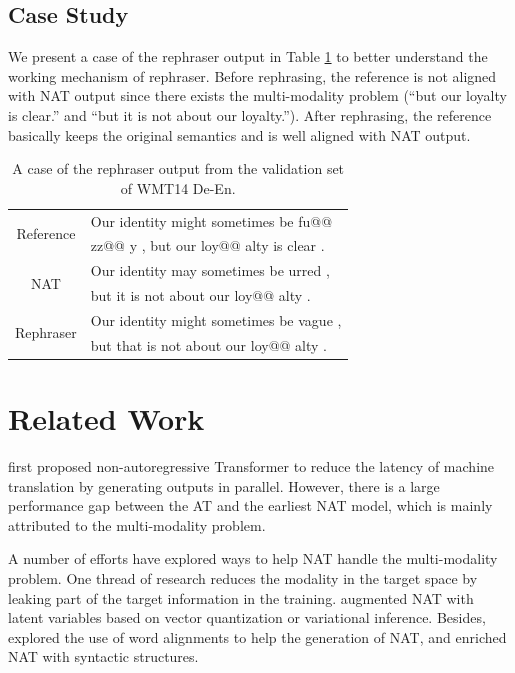 \documentclass[letterpaper]{article} %
\begin{document}
\subsection{Case Study}
We present a case of the rephraser output in Table \ref{tab:case} to better understand the working mechanism of rephraser. Before rephrasing, the reference is not aligned with NAT output since there exists the multi-modality problem (``but our loyalty is clear.'' and ``but it is not about our loyalty.''). After rephrasing, the reference basically keeps the original semantics and is well aligned with NAT output. 

\begin{table}[h]
\small
\centering
\begin{tabular}{c|l}
\toprule
\multirow{2}{*}{Reference} & Our identity might sometimes be fu@@ \\ &zz@@ y , but our loy@@ alty is clear .\\
\hline
\multirow{2}{*}{NAT} & Our identity may sometimes be urred ,\\& but it is not about our loy@@ alty .\\
\hline
\multirow{2}{*}{Rephraser} & Our identity might sometimes be vague ,\\& but that is not about our loy@@ alty .\\
\bottomrule
\end{tabular}
\caption{A case of the rephraser output from the validation set of WMT14 De-En.}
\label{tab:case}
\end{table}
\section{Related Work}
\citet{gu2017non} first proposed non-autoregressive Transformer to reduce the latency of machine translation by generating outputs in parallel. However, there is a large performance gap between the AT and the earliest NAT model, which is mainly attributed to the multi-modality problem.

A number of efforts have explored ways to help NAT handle the multi-modality problem. One thread of research reduces the modality in the target space by leaking part of the target information in the training. \citet{kaiser2018fast,Ma_2019,Shu2020LatentVariableNN,bao-etal-2021-non} augmented NAT with latent variables based on vector quantization or variational inference. Besides, \citet{gu2017non,ran2019guiding,bao2019nonautoregressive,song-etal-2021-alignart} explored the use of word alignments to help the generation of NAT, and \citet{akoury-etal-2019-syntactically,liu-etal-2021-enriching} enriched NAT with syntactic structures.
\end{document}
